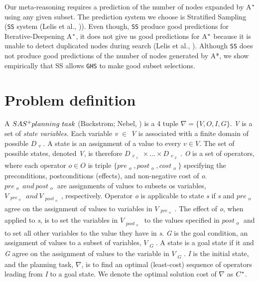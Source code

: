 Our meta-reasoning requires a prediction of the number of nodes expanded by A$\sp{*}$ using any given subset. The prediction system we choose is Stratified Sampling (\texttt{SS} system (Lelis et al., \citeyear{lelis2013predicting})). Even though, \texttt{SS} produce good predictions for Iterative-Deepening A$\sp{*}$, it does not give us good predictions for A$\sp{*}$ because it is unable to detect duplicated nodes during search (Lelis et al., \citeyear{lelis2014estimating}). Although \texttt{SS} does not produce good predictions of the number of nodes generated by A*, we show empirically that SS allows \texttt{GHS} to make good subset selections.

\section{Problem definition}

A $SAS\sp{+} planning\ task$ (B$\ddot{a}$ckstr$\ddot{o}$m; Nebel, \citeyear{backstrom1995complexity}) is a 4 tuple $\nabla = \{V, O, I, G\}.$ \textit{V} is a set of \textit{state variables.} Each variable \textit{v} $\in$ \textit{V} is associated with a finite domain of possible $D_{\substack{v}}$. A state is an assignment of a value to every $v \in V.$ The set of possible states, denoted \textit{V}, is therefore $D_{\substack{v_{\substack{1}}}}    \times ... \times D_{\substack{v_{\substack{2}}}}$. \textit{O} is a set of operators, where each operator $o \in O$ is triple $\{pre_{\substack{o}} , post_{\substack{o}}, cost_{\substack{o}}\}$ specifying the preconditions, postconditions (effects), and non-negative cost of \textit{o}. $pre_{\substack{o}}\ and\ post_{\substack{o}}$ are assignments of values to subsets os variables, $V_{\substack{pre_{\substack{o}}}}\ and\ V_{\substack{post_{\substack{o}}}}$, respectively. Operator \textit{o} is applicable to state \textit{s} if \textit{s} and $pre_{\substack{o}}$ agree on the assignment of values to variables in $V_{\substack{pre_{\substack{o}}}}$. The effect of \textit{o}, when applied to \textit{s}, is to set the variables in $V_{\substack{post_{\substack{o}}}}$ to the values specified in $post_{\substack{o}}$ and to set all other variables to the value they have in \textit{s}. \textit{G} is the goal condition, an assignment of values to a subset of variables, $V_{\substack{G}}$. A state is a goal state if it and \textit{G} agree on the assignment of values to the variable in $V_{\substack{G}}$. \textit{I} is the initial state, and the planning task, $\nabla$, is to find an optimal (least-cost) sequence of operators leading from \textit{I} to a goal state. We denote the optimal solution cost of $\nabla$ as $C\sp{*}$. 

